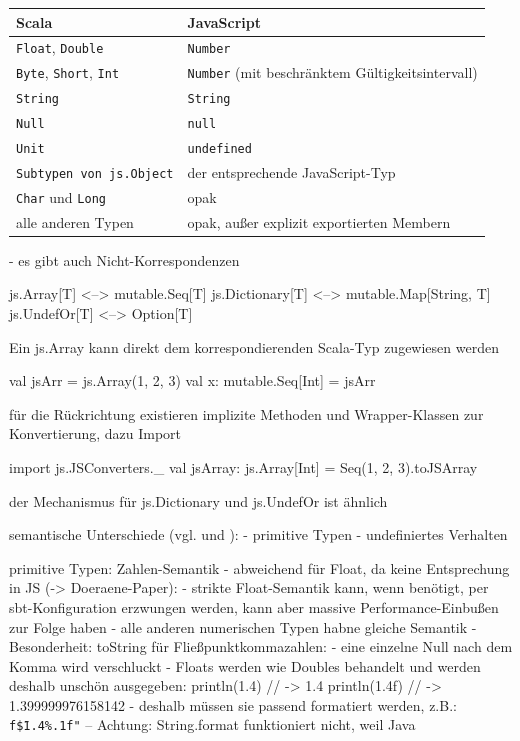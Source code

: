 \documentclass[a4paper, 12pt, listof=totoc, bibliography=totoc]{scrreprt}
\begin{document}
\medskip

\begin{tabular}{|l|l|}
\hline \textbf{Scala} & \textbf{JavaScript} \\ 
\hline \texttt{Float}, \texttt{Double} & \texttt{Number} \\ 
\hline \texttt{Byte}, \texttt{Short}, \texttt{Int} & \texttt{Number} (mit beschränktem Gültigkeitsintervall) \\ 
\hline \texttt{String} & \texttt{String} \\ 
\hline \texttt{Null} & \texttt{null} \\ 
\hline \texttt{Unit} & \texttt{undefined} \\ 
\hline \texttt{Subtypen von js.Object} & der entsprechende JavaScript-Typ \\ 
\hline \texttt{Char} und \texttt{Long} & opak \\ 
\hline alle anderen Typen & opak, außer explizit exportierten Membern \\ 
\hline 
\end{tabular}

\medskip


- es gibt auch Nicht-Korrespondenzen


js.Array[T] <--> mutable.Seq[T]
js.Dictionary[T] <--> mutable.Map[String, T]
js.UndefOr[T] <--> Option[T]

Ein js.Array kann direkt dem korrespondierenden Scala-Typ zugewiesen werden

val jsArr = js.Array(1, 2, 3)
val x: mutable.Seq[Int] = jsArr

für die Rückrichtung existieren implizite Methoden und Wrapper-Klassen zur Konvertierung, dazu Import

import js.JSConverters.\_
val jsArray: js.Array[Int] = Seq(1, 2, 3).toJSArray

der Mechanismus für js.Dictionary und js.UndefOr ist ähnlich






semantische Unterschiede (vgl. \cite{doeraene2015.SSP} und \cite{scalajs.DSS}):
	- primitive Typen
	- undefiniertes Verhalten

primitive Typen: Zahlen-Semantik
	- abweichend für Float, da keine Entsprechung in JS (-> Doeraene-Paper):
    - strikte Float-Semantik kann, wenn benötigt, per sbt-Konfiguration erzwungen werden, kann aber massive Performance-Einbußen zur Folge haben
    - alle anderen numerischen Typen habne gleiche Semantik
    - Besonderheit: toString für Fließpunktkommazahlen:
    	- eine einzelne Null nach dem Komma wird verschluckt
    	- Floats werden wie Doubles behandelt und werden deshalb unschön ausgegeben:
    	println(1.4)  // -> 1.4
		println(1.4f) // -> 1.399999976158142
	- deshalb müssen sie passend formatiert werden, z.B.: \texttt{f\"\${1.4}\%.1f"}  --  Achtung: String.format funktioniert nicht, weil Java
\end{document}
